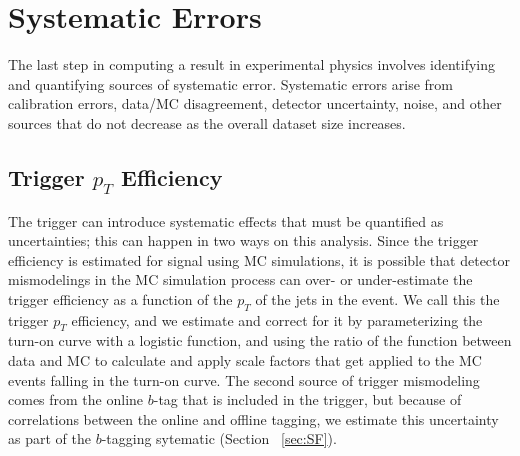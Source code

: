  

\chapter[Systematic Errors]{Systematic Errors}

The last step in computing a result in experimental physics involves identifying
and quantifying sources of systematic error.  Systematic errors arise from calibration
errors, data/MC disagreement, detector uncertainty, noise, and other sources
that do not decrease as the overall dataset size increases.  


\section{Trigger $p_T$ Efficiency}
\label{sec:trigger_syst}

The trigger can introduce systematic effects that must be quantified as uncertainties; 
this can happen in two ways on this analysis.  Since the trigger efficiency is estimated
for signal using MC simulations, it is possible that detector mismodelings in the MC 
simulation process can over- or under-estimate the trigger efficiency as a function 
of the $p_T$ of the jets in the event.  We call this the trigger $p_T$ efficiency,
and we estimate and correct for it by parameterizing the turn-on curve with a logistic
function, and using the ratio of the function between data and MC to calculate and 
apply scale factors that get applied to the MC events falling in the turn-on curve.  
The second source of trigger mismodeling comes from the online $b$-tag that is
included in the trigger, but because of correlations between the online and offline tagging,
we estimate this uncertainty as part of the $b$-tagging sytematic (Section ~\ref{sec:SF}).


